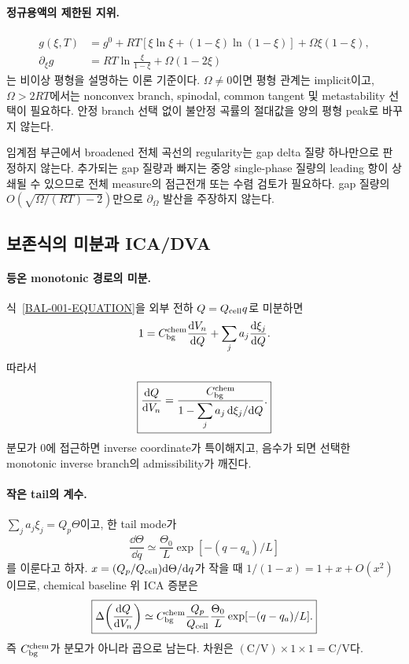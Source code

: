 \paragraph{ 정규용액의 제한된 지위.}
\begin{align}
g(\xi,T)
&=g^0+RT[\xi\ln\xi+(1-\xi)\ln(1-\xi)]
+\Omega\xi(1-\xi),\\
\partial_\xi g
&=RT\ln\frac{\xi}{1-\xi}+\Omega(1-2\xi)
\end{align}
는 비이상 평형을 설명하는 이론 기준이다. $\Omega\ne0$이면 평형
관계는 implicit이고, $\Omega>2RT$에서는 nonconvex branch,
spinodal, common tangent 및 metastability 선택이 필요하다. 안정
branch 선택 없이 불안정 곡률의 절대값을 양의 평형 peak로 바꾸지
않는다.

\begin{validity}
임계점 부근에서 broadened 전체 곡선의 regularity는 gap delta
질량 하나만으로 판정하지 않는다. 추가되는 gap 질량과 빠지는 중앙
single-phase 질량의 leading 항이 상쇄될 수 있으므로 전체 measure의
점근전개 또는 수렴 검토가 필요하다. gap 질량의
$O(\sqrt{\Omega/(RT)-2})$만으로 $\partial_\Omega$ 발산을 주장하지
않는다.
\end{validity}

\subsection{보존식의 미분과 ICA/DVA}\label{BAL-CH1-ICA}

\paragraph{ 등온 monotonic 경로의 미분.}
식~\eqref{BAL-001-EQUATION}을 외부 전하 $Q=Q_{\mathrm{cell}} q$로 미분하면
\[
1=C_{\mathrm{bg}}^{\mathrm{chem}}\frac{\mathrm d V_n}{\mathrm d Q}
+\sum_j a_j\frac{\mathrm d\xi_j}{\mathrm d Q}.
\]
따라서
\begin{equation}
\boxed{
\frac{\mathrm d Q}{\mathrm d V_n}
=\frac{C_{\mathrm{bg}}^{\mathrm{chem}}}
{1-\displaystyle\sum_j a_j\,\mathrm d\xi_j/\mathrm d Q}.
}
\label{BAL-003-EQUATION}
\end{equation}
분모가 0에 접근하면 inverse coordinate가 특이해지고, 음수가 되면
선택한 monotonic inverse branch의 admissibility가 깨진다.

\paragraph{ 작은 tail의 계수.}
$\sum_j a_j\xi_j=Q_p\Theta$이고, 한 tail mode가
\[
\frac{\dd\Theta}{\dd q}
\simeq\frac{\Theta_0}{L}\exp[-(q-q_a)/L]
\]
를 이룬다고 하자. $x=(Q_p/Q_{\mathrm{cell}})\mathrm d\Theta/\mathrm d q$가 작을 때
$1/(1-x)=1+x+O(x^2)$이므로, chemical baseline 위 ICA 증분은
\begin{equation}
\boxed{
\Delta\!\left(\frac{\mathrm d Q}{\mathrm d V_n}\right)
\simeq
C_{\mathrm{bg}}^{\mathrm{chem}}\frac{Q_p}{Q_{\mathrm{cell}}}
\frac{\Theta_0}{L}
\exp[-(q-q_a)/L].
}
\label{BAL-004-EQUATION}
\end{equation}
즉 $C_{\mathrm{bg}}^{\mathrm{chem}}$가 분모가 아니라 곱으로 남는다. 차원은
$(\mathrm{C/V})\times1\times1=\mathrm{C/V}$다.


